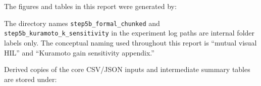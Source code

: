 \documentclass[11pt,a4paper]{article}
\begin{document}
The figures and tables in this report were generated by:

\begin{quote}
\end{quote}

The directory names \texttt{step5b\_formal\_chunked} and
\texttt{step5b\_kuramoto\_k\_sensitivity}
in the experiment log paths are internal folder labels only. The conceptual
naming used throughout this report is ``mutual visual HIL'' and
``Kuramoto gain sensitivity appendix.''

Derived copies of the core CSV/JSON inputs and intermediate summary tables
are stored under:

\begin{quote}
\end{quote}
\end{document}
